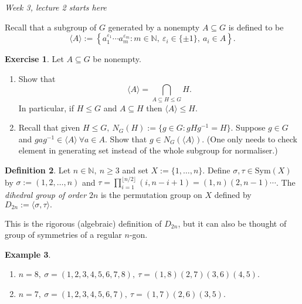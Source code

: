 \documentclass[a4paper]{article}
\newcommand{\Sym}{\text{Sym}}
\theoremstyle{definition}
\newtheorem{defn}{Definition}[subsection]
\newtheorem{example}[defn]{Example}
\newtheorem{exe}[defn]{Exercise}
\begin{document}
\begin{flushright}
\textit{Week 3, lecture 2 starts here}
\end{flushright}
Recall that a subgroup of $G$ generated by a nonempty $A\subseteq G$ is defined to be
\[
\langle A\rangle :=\left\{ a_1^{\varepsilon_1}\cdots a_m^{\varepsilon_m}:m\in\mathbb N,\ \varepsilon_i\in\{\pm 1\},\ a_i\in A \right\}.
\]
\begin{exe}
\label{exe:checkgeneratingset}
Let $A\subseteq G$ be nonempty.
\begin{enumerate}
\item Show that
\[
\langle A\rangle = \bigcap_{A\subseteq H\leq G} H.
\]
In particular, if $H\leq G$ and $A\subseteq H$ then $\langle A\rangle\leq H$.
\item Recall that given $H\leq G,\ N_G(H):=\{g\in G:gHg^{-1}=H\}$. Suppose $g\in G$ and $gag^{-1}\in\langle A\rangle \ \forall a\in A$. Show that $g\in N_G(\langle A\rangle).$ (One only needs to check element in generating set instead of the whole subgroup for normaliser.)
\end{enumerate}
\end{exe}
\begin{defn}
Let $n\in\mathbb N,\ n\geq 3$ and set $X:=\{1,\ldots,n\}$. Define $\sigma,\tau\in\Sym(X)$ by $\sigma:=(1,2,\ldots,n)$ and $\tau=\prod_{i=1}^{\lfloor n/2\rfloor} (i,n-i+1)=(1,n)(2,n-1)\cdots$. The \textit{dihedral group of order} $2n$ is the permutation group on $X$ defined by $D_{2n}:=\langle\sigma,\tau\rangle.$
\end{defn}
This is the rigorous (algebraic) definition of $D_{2n}$, but it can also be thought of group of symmetries of a regular $n$-gon.
\begin{example}
\begin{enumerate}
\item $n=8,\ \sigma=(1,2,3,4,5,6,7,8),\ \tau=(1,8)(2,7)(3,6)(4,5)$.
\item $n=7,\ \sigma=(1,2,3,4,5,6,7),\ \tau=(1,7)(2,6)(3,5)$.
\end{enumerate}
\end{example}
\end{document}
